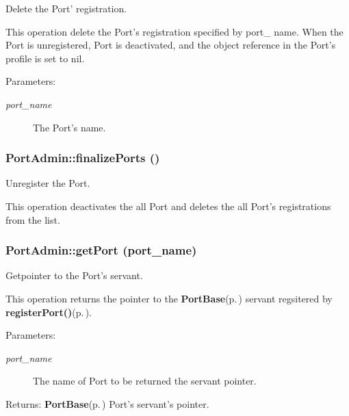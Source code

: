 Delete the Port' registration. 

This operation delete the Port's registration specified by port\_\- name. When the Port is unregistered, Port is deactivated, and the object reference in the Port's profile is set to nil. \begin{Desc}
\item[Parameters:]
\begin{description}
\item[{\em port\_\-name}]The Port's name.\end{description}
\end{Desc}
\subsubsection{\setlength{\rightskip}{0pt plus 5cm}Port\-Admin::finalize\-Ports ()}\label{classPortAdmin_PortAdmina13}


Unregister the Port. 

This operation deactivates the all Port and deletes the all Port's registrations from the list.
\subsubsection{\setlength{\rightskip}{0pt plus 5cm}Port\-Admin::get\-Port (port\_\-name)}\label{classPortAdmin_PortAdmina9}


Getpointer to the Port's servant. 

This operation returns the pointer to the {\bf Port\-Base}{\rm (p.\,\pageref{classPortBase})} servant regsitered by {\bf register\-Port()}{\rm (p.\,\pageref{classPortAdmin_PortAdmina10})}. \begin{Desc}
\item[Parameters:]
\begin{description}
\item[{\em port\_\-name}]The name of Port to be returned the servant pointer. \end{description}
\end{Desc}
\begin{Desc}
\item[Returns:]{\bf Port\-Base}{\rm (p.\,\pageref{classPortBase})} Port's servant's pointer.\end{Desc}
